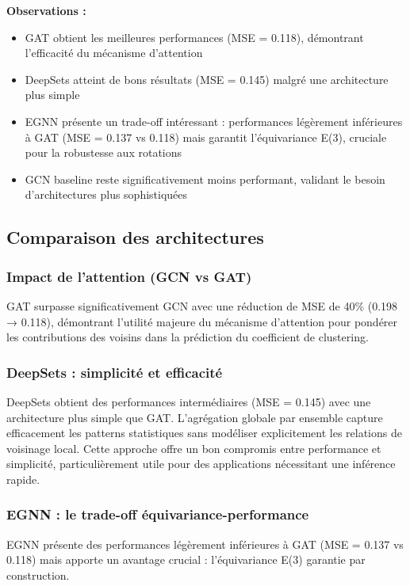 \textbf{Observations :}
\begin{itemize}
    \item GAT obtient les meilleures performances (MSE = 0.118), démontrant l'efficacité du mécanisme d'attention
    \item DeepSets atteint de bons résultats (MSE = 0.145) malgré une architecture plus simple
    \item EGNN présente un trade-off intéressant : performances légèrement inférieures à GAT (MSE = 0.137 vs 0.118) mais garantit l'équivariance E(3), cruciale pour la robustesse aux rotations
    \item GCN baseline reste significativement moins performant, validant le besoin d'architectures plus sophistiquées
\end{itemize}

\subsection{Comparaison des architectures}

\subsubsection{Impact de l'attention (GCN vs GAT)}

GAT surpasse significativement GCN avec une réduction de MSE de 40\% (0.198 → 0.118), démontrant l'utilité majeure du mécanisme d'attention pour pondérer les contributions des voisins dans la prédiction du coefficient de clustering.

\subsubsection{DeepSets : simplicité et efficacité}

DeepSets obtient des performances intermédiaires (MSE = 0.145) avec une architecture plus simple que GAT. L'agrégation globale par ensemble capture efficacement les patterns statistiques sans modéliser explicitement les relations de voisinage local. Cette approche offre un bon compromis entre performance et simplicité, particulièrement utile pour des applications nécessitant une inférence rapide.

\subsubsection{EGNN : le trade-off équivariance-performance}

EGNN présente des performances légèrement inférieures à GAT (MSE = 0.137 vs 0.118) mais apporte un avantage crucial : l'équivariance E(3) garantie par construction.

